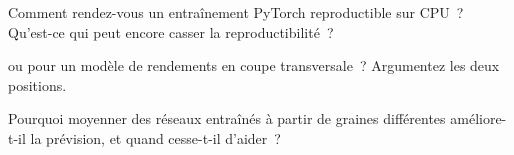 \begin{interviewq}\label{iq:ml:neural-networks-for-noisy-tabular-data:4}
Comment rendez-vous un entraînement PyTorch reproductible sur CPU~? Qu'est-ce qui peut encore casser la reproductibilité~?
\end{interviewq}

\begin{interviewq}\label{iq:ml:neural-networks-for-noisy-tabular-data:5}
 ou  pour un modèle de rendements en coupe transversale~? Argumentez les deux positions.
\end{interviewq}

\begin{interviewq}\label{iq:ml:neural-networks-for-noisy-tabular-data:6}
Pourquoi moyenner des réseaux entraînés à partir de graines différentes améliore-t-il la prévision, et quand cesse-t-il d'aider~?
\end{interviewq}
